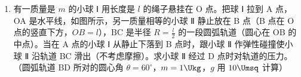\documentclass[\gkver]{gaokaozhenti}
\begin{document}
\begin{enumerate}
{$p_{1}\frac{V_{1}}{n}=p_{2}V_{2}$，

$p_{1}\left(1-\frac{1}{n}\right)V_{1}=p_{1}'V_{1}$，

把上两式相加得

$p_{1}V_{1}=p_{1}'V_{1}+p_{2}V_{2}$，

即 $p_{1}\times2=95p_{0}\times2+21p_{0}\times10$，

解得 $p_{1}=200p_{0}$，

所以筒内原来气体的压强为 200 个大气压。

评分标准：全题 10 分。（1）4 分，（2）6 分。

（1）正确算出水箱中空气压强的，给 4 分。漏算海面大气压的，扣 1 分。只列出 $\langle1\rangle$，没有代入数据计算的，只给 2 分。

$\langle1\rangle$ 式中没有写 $g$，但计算正确的，不扣分。单位不配套的，扣 1 分。

（2）正确算出贮气筒中原有气体压强的，给 6 分。

只列出 $\langle2\rangle$ 式、$\langle3\rangle$ 式的，各给 1 分。

只导出或只直接写出 $\langle4\rangle$ 式的，给 4 分。
}

\item
有一质量是 $m$ 的小球 Ⅰ 用长度是 $l$ 的绳子悬挂在 O 点。把球 Ⅰ 拉到 A 点，OA 是水平线，如图所示，另一质量相等的小球 Ⅱ 静止放在 B 点（B 点在 O 点的竖直下方，$OB=l$），BC 是半径 $R=\frac{l}{2}$ 的一段圆弧轨道（圆心在 OB 的中点）。当在 A 点的小球 Ⅰ 从静止下落到 B 点时，跟小球 Ⅱ 作弹性碰撞使小球 Ⅱ 沿轨道 BC 滑出（不考虑摩擦）。求小球 Ⅱ 经过 D 点时对轨道的压力。（圆弧轨道 BD 所对的圆心角 $\theta=60^{\circ}$，$m=1\Ukg$，$g$ 用 $10\Umsq$ 计算）

\jdanswer{
$35\UN$
}

\end{enumerate}
\end{document}
